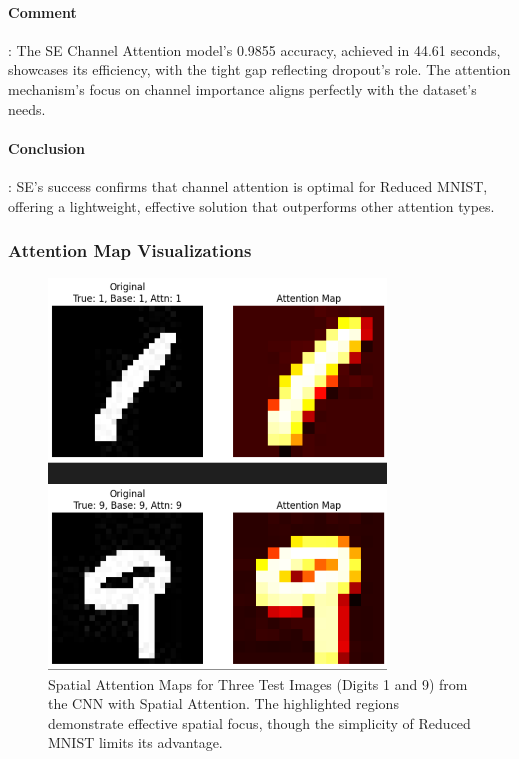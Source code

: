 \documentclass[12pt]{article}
\begin{document}
\paragraph{Comment}: The SE Channel Attention model's 0.9855 accuracy, achieved in 44.61 seconds, showcases its efficiency, with the tight gap reflecting dropout's role. The attention mechanism's focus on channel importance aligns perfectly with the dataset's needs.
\paragraph{Conclusion}: SE's success confirms that channel attention is optimal for Reduced MNIST, offering a lightweight, effective solution that outperforms other attention types.

\subsubsection{Attention Map Visualizations}
\begin{figure}[H]
    \centering
    \includegraphics[width=0.8\textwidth]{spatial_attention_maps.png}
    \caption{Spatial Attention Maps for Three Test Images (Digits 1 and 9) from the CNN with Spatial Attention. The highlighted regions demonstrate effective spatial focus, though the simplicity of Reduced MNIST limits its advantage.}
    \label{fig:spatial_attention_maps}
    
\end{figure}
\end{document}
